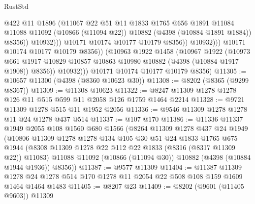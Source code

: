 \begin{lexlean}{RustStd}
\begin{coremodule}
                                @422
                                @11
                                @1896
                                (@11067
                                  @22
                                  @51
                                  @11
                                  @1833
                                  @1765
                                  @656
                                  @1891
                                  @11084
                                  @11088
                                  @11092
                                  (@10866 (@11094 @22))
                                  @10882
                                  (@4398 (@10884 @1891 @1884))
                                  @8356))
                              @10932)))
                        @10171
                        @10174
                        @10177
                        @10179
                        @8356))
                    @10932)))
              @10171
              @10174
              @10177
              @10179
              @8356))
          (@10963
            @1922
            @1458
            (@10967
              @1922
              (@10973
                @661
                @1917
                @10829
                @10857
                @10863
                @10980
                @10882
                (@4398 (@10884 @1917 @1908))
                @8356))
            @10932)))
      @10171
      @10174
      @10177
      @10179
      @8356)
@11305 := @10657 @11300 (@4398 (@8360 @10623 @30))
@11308 := @8202 (@8365 (@9299 @8367))
@11309 := @11308 @10623
@11322 := @8247 @11309 @1278 @1278 @126 @11 @515 @599 @11 @2058 @126 @1759 @1464 @2214
@11328 := @9721 @11309 @1278 @515 @11 @1952 @2056
@11336 := @9546 @11309 @1278 @1278 @11 @24 @1278 @437 @514
@11337 := @107 @170
@11386 := @11336
    @11337
    @1949
    @2055
    @108
    @1560
    @680
    @1566
    (@8264
      @11309
      @1278
      @437
      @24
      @1949
      (@10806
        @11309
        @1278
        @1278
        @134
        @105
        @30
        @51
        @24
        @1833
        @1765
        @675
        @1944
        (@8308 @11309 @1278 @22 @112 @22 @1833 (@8316 (@8317 @11309 @22)) @11083)
        @11088
        @11092
        (@10866 (@11094 @30))
        @10882
        (@4398 (@10884 @1944 @1936))
        @8356))
@11387 := @9577 @11309
@11404 := @11387
    @11309
    @1278
    @24
    @1278
    @514
    @170
    @1278
    @11
    @2054
    @22
    @508
    @108
    @159
    @1609
    @1464
    @1464
    @1483
@11405 := @8207 @23
@11409 := @8202 (@9601 (@11405 @9603)) @11309

\end{coremodule}
\end{lexlean}
